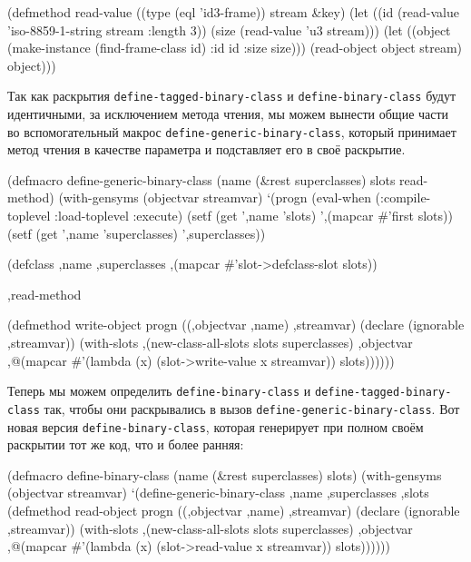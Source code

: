 \begin{myverb}
(defmethod read-value ((type (eql 'id3-frame)) stream &key)
  (let ((id (read-value 'iso-8859-1-string stream :length 3))
        (size (read-value 'u3 stream)))
    (let ((object (make-instance (find-frame-class id) :id id :size size)))
      (read-object object stream)
      object)))
\end{myverb}

Так как раскрытия \lstinline{define-tagged-binary-class} и \lstinline{define-binary-class} будут
идентичными, за исключением метода чтения, мы можем вынести общие части во вспомогательный
макрос \lstinline{define-generic-binary-class}, который принимает метод чтения в качестве
параметра и подставляет его в своё раскрытие.

\begin{myverb}
(defmacro define-generic-binary-class (name (&rest superclasses) slots read-method)
  (with-gensyms (objectvar streamvar)
    `(progn
       (eval-when (:compile-toplevel :load-toplevel :execute)
         (setf (get ',name 'slots) ',(mapcar #'first slots))
         (setf (get ',name 'superclasses) ',superclasses))

       (defclass ,name ,superclasses
         ,(mapcar #'slot->defclass-slot slots))

       ,read-method

       (defmethod write-object progn ((,objectvar ,name) ,streamvar)
         (declare (ignorable ,streamvar))
         (with-slots ,(new-class-all-slots slots superclasses) ,objectvar
           ,@(mapcar #'(lambda (x) (slot->write-value x streamvar)) slots))))))
\end{myverb}

Теперь мы можем определить \lstinline{define-binary-class} и \lstinline{define-tagged-binary-class} так, чтобы они раскрывались в вызов \lstinline{define-generic-binary-class}. Вот новая версия \lstinline{define-binary-class}, которая генерирует при полном своём раскрытии тот же код, что и более ранняя:

\begin{myverb}
(defmacro define-binary-class (name (&rest superclasses) slots)
  (with-gensyms (objectvar streamvar)
    `(define-generic-binary-class ,name ,superclasses ,slots
       (defmethod read-object progn ((,objectvar ,name) ,streamvar)
         (declare (ignorable ,streamvar))
         (with-slots ,(new-class-all-slots slots superclasses) ,objectvar
           ,@(mapcar #'(lambda (x) (slot->read-value x streamvar)) slots))))))
\end{myverb}

